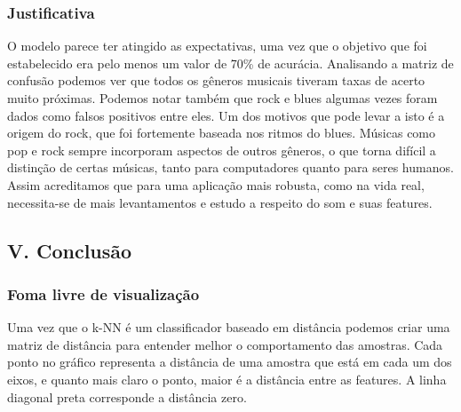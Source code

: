 \documentclass[11pt]{article}
\begin{document}
    \subsubsection{Justificativa}\label{justificativa}

    O modelo parece ter atingido as expectativas, uma vez que o objetivo que
foi estabelecido era pelo menos um valor de 70\% de acurácia. Analisando
a matriz de confusão podemos ver que todos os gêneros musicais tiveram
taxas de acerto muito próximas. Podemos notar também que rock e blues
algumas vezes foram dados como falsos positivos entre eles. Um dos
motivos que pode levar a isto é a origem do rock, que foi fortemente
baseada nos ritmos do blues. Músicas como pop e rock sempre incorporam
aspectos de outros gêneros, o que torna difícil a distinção de certas
músicas, tanto para computadores quanto para seres humanos. Assim
acreditamos que para uma aplicação mais robusta, como na vida real,
necessita-se de mais levantamentos e estudo a respeito do som e suas
features.

    \subsection{V. Conclusão}\label{v.-conclusuxe3o}

\subsubsection{Foma livre de
visualização}\label{foma-livre-de-visualizauxe7uxe3o}

Uma vez que o k-NN é um classificador baseado em distância podemos criar
uma matriz de distância para entender melhor o comportamento das
amostras. Cada ponto no gráfico representa a distância de uma amostra
que está em cada um dos eixos, e quanto mais claro o ponto, maior é a
distância entre as features. A linha diagonal preta corresponde a
distância zero.
\end{document}

